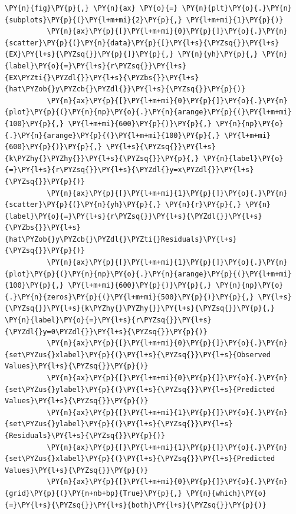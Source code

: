 \documentclass[10pt]{article}\usepackage[]{graphicx}\usepackage[]{xcolor}
\begin{document}
    \begin{Verbatim}[commandchars=\\\{\}]
 \PY{n}{fig}\PY{p}{,} \PY{n}{ax} \PY{o}{=} \PY{n}{plt}\PY{o}{.}\PY{n}{subplots}\PY{p}{(}\PY{l+m+mi}{2}\PY{p}{,} \PY{l+m+mi}{1}\PY{p}{)}
          \PY{n}{ax}\PY{p}{[}\PY{l+m+mi}{0}\PY{p}{]}\PY{o}{.}\PY{n}{scatter}\PY{p}{(}\PY{n}{data}\PY{p}{[}\PY{l+s}{\PYZsq{}}\PY{l+s}{EX}\PY{l+s}{\PYZsq{}}\PY{p}{]}\PY{p}{,} \PY{n}{yh}\PY{p}{,} \PY{n}{label}\PY{o}{=}\PY{l+s}{r\PYZsq{}}\PY{l+s}{EX\PYZti{}\PYZdl{}}\PY{l+s}{\PYZbs{}}\PY{l+s}{hat\PYZob{}y\PYZcb{}\PYZdl{}}\PY{l+s}{\PYZsq{}}\PY{p}{)}
          \PY{n}{ax}\PY{p}{[}\PY{l+m+mi}{0}\PY{p}{]}\PY{o}{.}\PY{n}{plot}\PY{p}{(}\PY{n}{np}\PY{o}{.}\PY{n}{arange}\PY{p}{(}\PY{l+m+mi}{100}\PY{p}{,} \PY{l+m+mi}{600}\PY{p}{)}\PY{p}{,} \PY{n}{np}\PY{o}{.}\PY{n}{arange}\PY{p}{(}\PY{l+m+mi}{100}\PY{p}{,} \PY{l+m+mi}{600}\PY{p}{)}\PY{p}{,} \PY{l+s}{\PYZsq{}}\PY{l+s}{k\PYZhy{}\PYZhy{}}\PY{l+s}{\PYZsq{}}\PY{p}{,} \PY{n}{label}\PY{o}{=}\PY{l+s}{r\PYZsq{}}\PY{l+s}{\PYZdl{}y=x\PYZdl{}}\PY{l+s}{\PYZsq{}}\PY{p}{)}
          \PY{n}{ax}\PY{p}{[}\PY{l+m+mi}{1}\PY{p}{]}\PY{o}{.}\PY{n}{scatter}\PY{p}{(}\PY{n}{yh}\PY{p}{,} \PY{n}{r}\PY{p}{,} \PY{n}{label}\PY{o}{=}\PY{l+s}{r\PYZsq{}}\PY{l+s}{\PYZdl{}}\PY{l+s}{\PYZbs{}}\PY{l+s}{hat\PYZob{}y\PYZcb{}\PYZdl{}\PYZti{}Residuals}\PY{l+s}{\PYZsq{}}\PY{p}{)}
          \PY{n}{ax}\PY{p}{[}\PY{l+m+mi}{1}\PY{p}{]}\PY{o}{.}\PY{n}{plot}\PY{p}{(}\PY{n}{np}\PY{o}{.}\PY{n}{arange}\PY{p}{(}\PY{l+m+mi}{100}\PY{p}{,} \PY{l+m+mi}{600}\PY{p}{)}\PY{p}{,} \PY{n}{np}\PY{o}{.}\PY{n}{zeros}\PY{p}{(}\PY{l+m+mi}{500}\PY{p}{)}\PY{p}{,} \PY{l+s}{\PYZsq{}}\PY{l+s}{k\PYZhy{}\PYZhy{}}\PY{l+s}{\PYZsq{}}\PY{p}{,} \PY{n}{label}\PY{o}{=}\PY{l+s}{r\PYZsq{}}\PY{l+s}{\PYZdl{}y=0\PYZdl{}}\PY{l+s}{\PYZsq{}}\PY{p}{)}
          \PY{n}{ax}\PY{p}{[}\PY{l+m+mi}{0}\PY{p}{]}\PY{o}{.}\PY{n}{set\PYZus{}xlabel}\PY{p}{(}\PY{l+s}{\PYZsq{}}\PY{l+s}{Observed Values}\PY{l+s}{\PYZsq{}}\PY{p}{)}
          \PY{n}{ax}\PY{p}{[}\PY{l+m+mi}{0}\PY{p}{]}\PY{o}{.}\PY{n}{set\PYZus{}ylabel}\PY{p}{(}\PY{l+s}{\PYZsq{}}\PY{l+s}{Predicted Values}\PY{l+s}{\PYZsq{}}\PY{p}{)}
          \PY{n}{ax}\PY{p}{[}\PY{l+m+mi}{1}\PY{p}{]}\PY{o}{.}\PY{n}{set\PYZus{}ylabel}\PY{p}{(}\PY{l+s}{\PYZsq{}}\PY{l+s}{Residuals}\PY{l+s}{\PYZsq{}}\PY{p}{)}
          \PY{n}{ax}\PY{p}{[}\PY{l+m+mi}{1}\PY{p}{]}\PY{o}{.}\PY{n}{set\PYZus{}xlabel}\PY{p}{(}\PY{l+s}{\PYZsq{}}\PY{l+s}{Predicted Values}\PY{l+s}{\PYZsq{}}\PY{p}{)}
          \PY{n}{ax}\PY{p}{[}\PY{l+m+mi}{0}\PY{p}{]}\PY{o}{.}\PY{n}{grid}\PY{p}{(}\PY{n+nb+bp}{True}\PY{p}{,} \PY{n}{which}\PY{o}{=}\PY{l+s}{\PYZsq{}}\PY{l+s}{both}\PY{l+s}{\PYZsq{}}\PY{p}{)}

\end{Verbatim}
\end{document}
